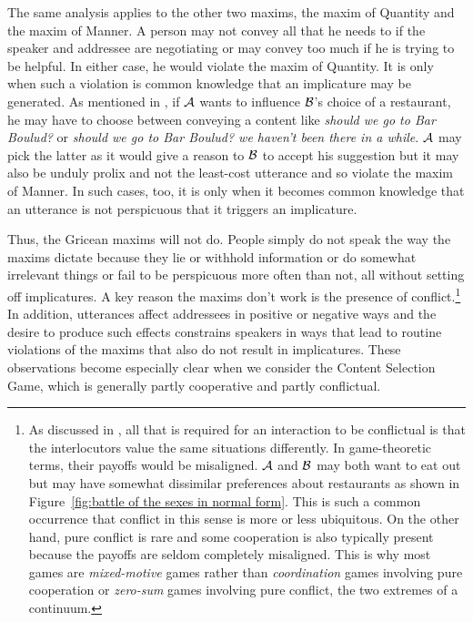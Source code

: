 The same analysis applies to the other two maxims, the maxim of Quantity and the maxim of Manner. A person may not convey all that he needs to if the speaker and addressee are negotiating or may convey too much if he is trying to be helpful. In either case, he would violate the maxim of Quantity. It is only when such a violation is common knowledge that an implicature may be generated. As mentioned in , if $\cal A$ wants to influence $\cal B$'s choice of a restaurant, he may have to choose between conveying a content like \emph{should we go to Bar Boulud?} or \emph{should we go to Bar Boulud? we haven't been there in a while}. $\cal A$ may pick the latter as it would give a reason to $\cal B$ to accept his suggestion but it may also be unduly prolix and not the least-cost utterance and so violate the maxim of Manner. In such cases, too, it is only when it becomes common knowledge that an utterance is not perspicuous that it triggers an implicature.

Thus, the Gricean maxims will not do. People simply do not speak the way the maxims dictate because they lie or withhold information or do somewhat irrelevant things or fail to be perspicuous more often than not, all without setting off implicatures. A key reason the maxims don't work is the presence of conflict.\footnote{As discussed in , all that is required for an interaction to be conflictual is that the interlocutors value the same situations differently. In game-theoretic terms, their payoffs would be misaligned. $\cal A$ and $\cal B$ may both want to eat out but may have somewhat dissimilar preferences about restaurants as shown in Figure~\ref{fig:battle of the sexes in normal form}. This is such a common occurrence that conflict in this sense is more or less ubiquitous. On the other hand, pure conflict is rare and some cooperation is also typically present because the payoffs are seldom completely misaligned. This is why most games are \emph{mixed-motive} games rather than \emph{coordination} games involving pure cooperation or \emph{zero-sum} games involving pure conflict, the two extremes of a continuum.} In addition, utterances affect addressees in positive or negative ways and the desire to produce such effects constrains speakers in ways that lead to routine violations of the maxims that also do not result in implicatures. These observations become especially clear when we consider the Content Selection Game, which is generally partly cooperative and partly conflictual. 

